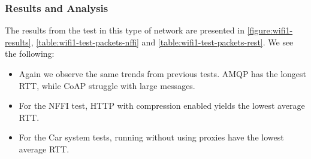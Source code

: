 \subsubsection{Results and Analysis}

The results from the test in this type of network are presented in
\cref{figure:wifi1-results}, \cref{table:wifi1-test-packets-nffi} and
\cref{table:wifi1-test-packets-rest}. We see the following:

\begin{itemize}

    \item Again we observe the same trends from previous tests. AMQP has the
    longest RTT, while CoAP struggle with large messages.

    \item For the NFFI test, HTTP with compression enabled yields the lowest
    average RTT.

    \item For the Car system tests, running without using proxies have the
    lowest average RTT.

\end{itemize}


\begin{landscape}
    \begin{figure}
    \centering
    \begin{floatrow}
    \end{floatrow}
    \end{figure}
\end{landscape}

